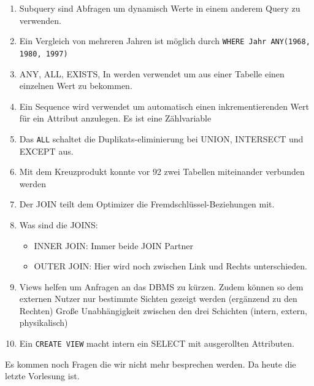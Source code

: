 \documentclass[a4paper]{article}
\begin{document}
\begin{enumerate}
\begin{enumerate}
    \end{enumerate}
    selbst wenn es in einer anderen Reihenfolge aufgeschrieben wird:
    \begin{enumerate}
        \item SELECT
        \item from
        \item Where
        \item Group By
        \item having
        \item Order By
    \end{enumerate}
    \item Subquery sind Abfragen um dynamisch Werte in einem anderem Query zu verwenden.
    \item Ein Vergleich von mehreren Jahren ist möglich durch \lstinline|WHERE Jahr ANY(1968, 1980, 1997)|
    \item ANY, ALL, EXISTS, In werden verwendet um aus einer Tabelle einen einzelnen Wert zu bekommen.
    \item Ein Sequence wird verwendet um automatisch einen inkrementierenden Wert für ein Attribut anzulegen. Es ist eine Zählvariable
    \item Das \lstinline|ALL| schaltet die Duplikats-eliminierung bei UNION, INTERSECT und EXCEPT aus.
    \item Mit dem Kreuzprodukt konnte vor 92 zwei Tabellen miteinander verbunden werden
    \item Der JOIN teilt dem Optimizer die Fremdschlüssel-Beziehungen mit.
    \item Was sind die JOINS:
    \begin{itemize}
        \item INNER JOIN: Immer beide JOIN Partner
        \item OUTER JOIN: Hier wird noch zwischen Link und Rechts unterschieden.
    \end{itemize}
    \item Views helfen um Anfragen an das DBMS zu kürzen. Zudem können so dem externen Nutzer nur bestimmte Sichten gezeigt werden (ergänzend zu den Rechten) Große Unabhängigkeit zwischen den drei Schichten (intern, extern, physikalisch)
    \item Ein \lstinline|CREATE VIEW| macht intern ein SELECT mit ausgerollten Attributen.
\end{enumerate} 

Es kommen noch Fragen die wir nicht mehr besprechen werden. Da heute die letzte Vorlesung ist.
\end{document}
